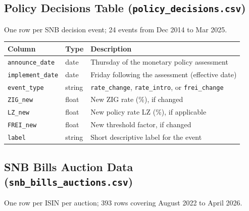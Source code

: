 \documentclass[12pt,a4paper]{article}
\begin{document}
\subsection{Policy Decisions Table (\texttt{policy\_decisions.csv})}

One row per SNB decision event; 24 events from Dec 2014 to Mar 2025.

\begin{center}
\begin{tabular}{L{3.2cm} L{3.2cm} L{7cm}}
  \toprule
  \textbf{Column} & \textbf{Type} & \textbf{Description} \\
  \midrule
  \texttt{announce\_date}  & date    & Thursday of the monetary policy assessment \\
  \texttt{implement\_date} & date    & Friday following the assessment (effective date) \\
  \texttt{event\_type}     & string  & \texttt{rate\_change}, \texttt{rate\_intro},
                                       or \texttt{frei\_change} \\
  \texttt{ZIG\_new}        & float   & New ZIG rate (\%), if changed \\
  \texttt{LZ\_new}         & float   & New policy rate LZ (\%), if applicable \\
  \texttt{FREI\_new}       & float   & New threshold factor, if changed \\
  \texttt{label}           & string  & Short descriptive label for the event \\
  \bottomrule
\end{tabular}
\end{center}

\subsection{SNB Bills Auction Data (\texttt{snb\_bills\_auctions.csv})}

One row per ISIN per auction; 393 rows covering August 2022 to April 2026.
\end{document}
